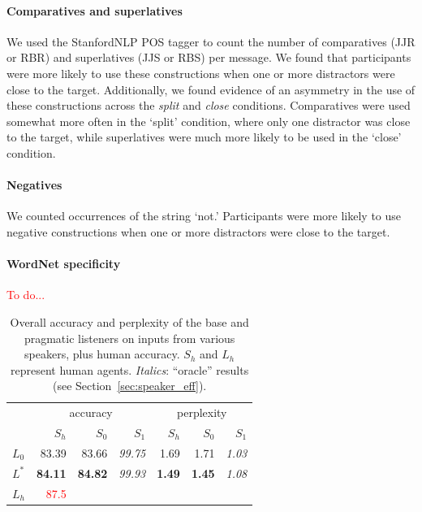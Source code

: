 \documentclass[11pt,letterpaper]{article}
\newcommand{\Listener}{L}
\newcommand{\Speaker}{S}
\renewcommand{\|}{\mid}
\newcommand{\best}[1]{\textbf{#1}}
\newcommand{\oracle}[1]{\textit{#1}}
\newcommand{\secref}[1]{Section~\ref{#1}}
\newcommand{\todocheck}[1]{\textcolor{red}{#1}}
\begin{document}
\paragraph{Comparatives and superlatives} We used the StanfordNLP POS tagger to count the number of comparatives (JJR or RBR) and superlatives (JJS or RBS) per message. We found that participants were more likely to use these constructions when one or more distractors were close to the target. Additionally, we found evidence of an asymmetry in the use of these constructions across the \emph{split} and \emph{close} conditions. Comparatives were used somewhat more often in the `split' condition, where only one distractor was close to the target, while superlatives were much more likely to be used in the `close' condition.

\paragraph{Negatives} We counted occurrences of the string `not.' Participants were more likely to use negative constructions when one or more distractors were close to the target.

\paragraph{WordNet specificity} \todocheck{To do...} \cite{Fellbaum1998}

\begin{table}[t]
\centering
\begin{tabular}{lrrrrrr}
  \hline
   & \multicolumn{3}{c}{accuracy} & \multicolumn{3}{c}{perplexity} \\
   & $\Speaker_h$ & $\Speaker_0$ & $\Speaker_1$ & $\Speaker_h$ & $\Speaker_0$ & $\Speaker_1$ \\
  \hline
  $\Listener_0$ & 83.39 & 83.66 & \oracle{99.75} & 1.69 & 1.71 & \oracle{1.03} \\
  $\Listener^*$ & \best{84.11} & \best{84.82} & \oracle{99.93} & \best{1.49} & \best{1.45} & \oracle{1.08} \\
  \hline
  $\Listener_h$ & \todocheck{87.5} \\
   \hline
\end{tabular}
\caption{Overall accuracy and perplexity of the base and pragmatic listeners
on inputs from various speakers, plus human accuracy. $\Speaker_h$ and $\Listener_h$
represent human agents. \oracle{Italics}: ``oracle'' results (see \secref{sec:speaker_eff}).}
\label{table:speakerVsListener}
\end{table}
\end{document}
